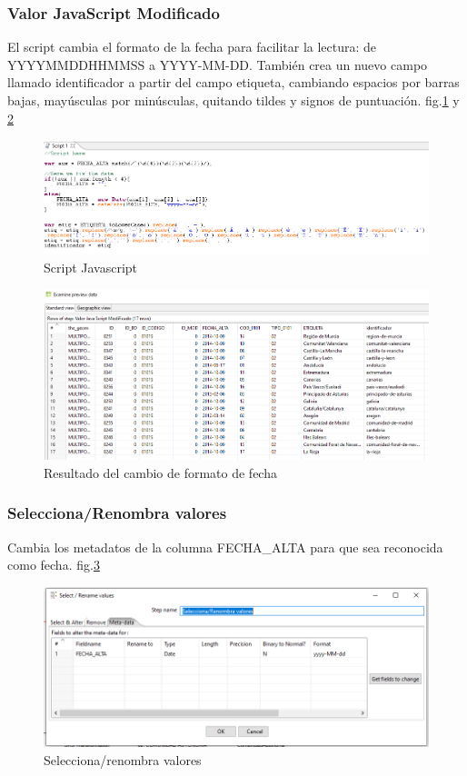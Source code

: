 \subsubsection{Valor JavaScript Modificado}
El script cambia el formato de la fecha para facilitar la lectura: de YYYYMMDDHHMMSS a YYYY-MM-DD. También
crea un nuevo campo llamado identificador a partir del campo etiqueta, cambiando espacios por barras bajas, mayúsculas
por minúsculas, quitando tildes y signos de puntuación. fig.\ref{fig:script} y \ref{fig:fecha}

\begin{figure}[H]
    \includegraphics[width=\textwidth]{images/script.png}
    \centering
    \caption{Script Javascript}
    \label{fig:script}
\end{figure}

\begin{figure}[H]
    \includegraphics[width=\textwidth]{images/fecha.png}
    \centering
    \caption{Resultado del cambio de formato de fecha}
    \label{fig:fecha}
\end{figure}

\subsubsection{Selecciona/Renombra valores}
Cambia los metadatos de la columna FECHA\_ALTA para que sea reconocida como fecha. fig.\ref{fig:selecciona-renombra}

\begin{figure}[H]
    \includegraphics[width=\textwidth]{images/selecciona-renombra.png}
    \centering
    \caption{Selecciona/renombra valores}
    \label{fig:selecciona-renombra}
\end{figure}

